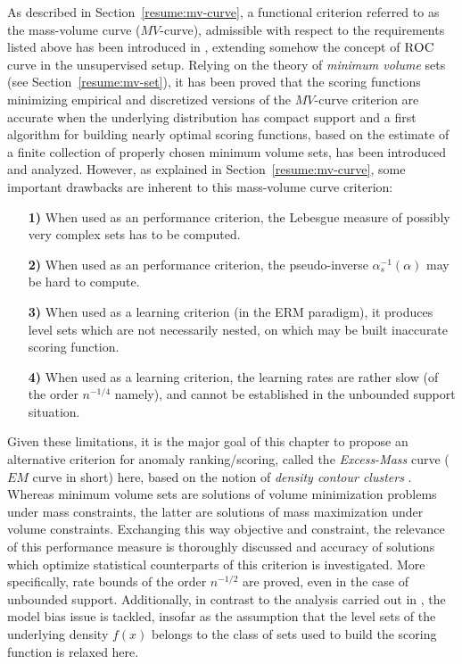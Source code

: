 As described in Section~\ref{resume:mv-curve}, a functional criterion referred to as the mass-volume curve ($MV$-curve), admissible with respect to the requirements listed above has been introduced in \cite{CLEM13}, extending somehow the concept of $\textsc{ROC}$ curve in the unsupervised setup. Relying on the theory of \textit{minimum volume} sets (see Section~\ref{resume:mv-set}), it has been proved that the scoring functions minimizing empirical and discretized versions of the $MV$-curve criterion are accurate when the underlying distribution has compact support and a first algorithm for building nearly optimal scoring functions, based on the estimate of a finite collection of properly chosen minimum volume sets, has been introduced and analyzed. 
However, as explained in Section~\ref{resume:mv-curve}, some important drawbacks are inherent to this mass-volume curve criterion:
\begin{itemize}
\item[\textbf{1)}] When used as an performance criterion, the Lebesgue measure of possibly very complex sets has to be computed.
\item[\textbf{2)}] When used as an performance criterion, the pseudo-inverse $\alpha_s^{-1}(\alpha)$ may be hard to compute.
\item[\textbf{3)}] When used as a learning criterion (in the ERM paradigm), it produces level sets which are not necessarily nested, on which may be built inaccurate scoring function. 
\item[\textbf{4)}] When used as a learning criterion, the learning rates are rather slow (of the order $n^{-1/4}$ namely), and cannot be established in the unbounded support situation.
\end{itemize}
 Given these limitations, it is the major goal of this chapter to propose an alternative criterion for anomaly ranking/scoring, called the \textit{Excess-Mass} curve ($EM$ curve in short) here, based on the notion of {\it density contour clusters}  \cite{Polonik95,Hartigan1987,Muller1991}. Whereas minimum volume sets are solutions of volume minimization problems under mass constraints, the latter are solutions of mass maximization under volume constraints. Exchanging this way objective and constraint, the relevance of this performance measure is thoroughly discussed and accuracy of solutions which optimize statistical counterparts of this criterion is
investigated. More specifically, rate bounds of the order $n^{-1/2}$ are proved, even in the case of unbounded support. Additionally, in contrast to the analysis carried out in \cite{CLEM13}, the model bias issue is tackled,
insofar as the assumption that the level sets of the underlying
density $f(x)$ belongs to the class of sets used to build the scoring
function is relaxed here. 

